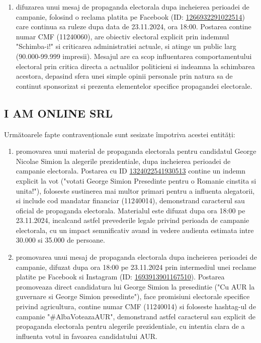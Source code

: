 \documentclass[a4paper,12pt]{article}
\begin{document}
\begin{enumerate}[leftmargin=*, label=\arabic*.)]
    \item difuzarea unui mesaj de propaganda electorala dupa incheierea perioadei de campanie, folosind o reclama platita pe Facebook (ID: \href{https://www.facebook.com/ads/library/?id=1266932291022514}{1266932291022514}) care continua sa ruleze dupa data de 23.11.2024, ora 18:00. Postarea contine numar CMF (11240060), are obiectiv electoral explicit prin indemnul "Schimba-i!" si criticarea administratiei actuale, si atinge un public larg (90.000-99.999 impresii). Mesajul are ca scop influentarea comportamentului electoral prin critica directa a actualilor politicieni si indeamna la schimbarea acestora, depasind sfera unei simple opinii personale prin natura sa de continut sponsorizat si prezenta elementelor specifice propagandei electorale.
\end{enumerate}

\vspace{0.5cm}

\subsection{I AM ONLINE SRL}
Următoarele fapte contravenționale sunt sesizate împotriva acestei entități:

\begin{enumerate}[leftmargin=*, label=\arabic*.)]
    \item promovarea unui material de propaganda electorala pentru candidatul George Nicolae Simion la alegerile prezidentiale, dupa incheierea perioadei de campanie electorala. Postarea cu ID \href{https://www.facebook.com/ads/library/?id=1324022541930513}{1324022541930513} contine un indemn explicit la vot ("votati George Simion Presedinte pentru o Romanie cinstita si unita!"), foloseste sustinerea mai multor primari pentru a influenta alegatorii, si include cod mandatar financiar (11240014), demonstrand caracterul sau oficial de propaganda electorala. Materialul este difuzat dupa ora 18:00 pe 23.11.2024, incalcand astfel prevederile legale privind perioada de campanie electorala, cu un impact semnificativ avand in vedere audienta estimata intre 30.000 si 35.000 de persoane.
    \item promovarea unui mesaj de propaganda electorala dupa incheierea perioadei de campanie, difuzat dupa ora 18:00 pe 23.11.2024 prin intermediul unei reclame platite pe Facebook si Instagram (ID: \href{https://www.facebook.com/ads/library/?id=1693913901167510}{1693913901167510}). Postarea promoveaza direct candidatura lui George Simion la presedintie ("Cu AUR la guvernare si George Simion presedinte"), face promisiuni electorale specifice privind agricultura, contine numar CMF (11240014) si foloseste hashtag-ul de campanie "\#AlbaVoteazaAUR", demonstrand astfel caracterul sau explicit de propaganda electorala pentru alegerile prezidentiale, cu intentia clara de a influenta votul in favoarea candidatului AUR.
\end{enumerate}
\end{document}
